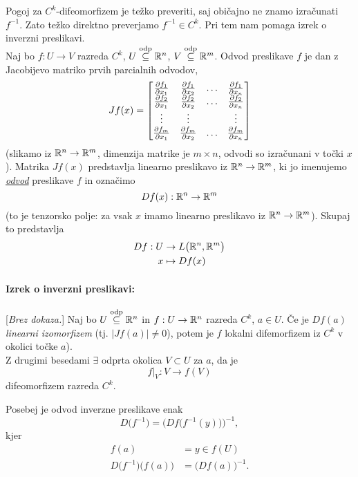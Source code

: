 Pogoj za $C^k$-difeomorfizem je te\v zko preveriti, saj obi\v cajno ne znamo izra\v cunati $f^{-1}$. Zato te\v zko direktno preverjamo $f^{-1} \in C^k$.
Pri tem nam pomaga izrek o inverzni preslikavi.\\[6pt]

Naj bo $f : U \to V$ razreda $C^k$, $U \odp \R^n$, $V \odp \R^m$. Odvod preslikave $f$ je dan z Jacobijevo matriko prvih parcialnih odvodov,
\[
	Jf(x) = \begin{bmatrix}
		\prt[1]{f_1} & \prt[2]{f_1} & \ldots & \prt[n]{f_1} \\
		\prt[1]{f_2} & \prt[2]{f_2} & \ldots & \prt[n]{f_2} \\
		\vdots       & \vdots       &        & \vdots       \\
		\prt[1]{f_m} & \prt[2]{f_m} & \ldots & \prt[n]{f_m}
	\end{bmatrix}
\] (slikamo iz $\R^n \to \R^m$, dimenzija matrike je $m \times n$, odvodi so izra\v cunani v to\v cki $x$). Matrika $Jf(x)$ predstavlja linearno
preslikavo iz $\R^n \to \R^m$, ki jo imenujemo \underline{\emph{odvod}} preslikave $f$ in ozna\v cimo
\[
	Df(x) : \R^n \to \R^m
\]
(to je tenzorsko polje: za vsak $x$ imamo linearno preslikavo iz $\R^n \to \R^m$). Skupaj to predstavlja
\begin{align*}
	Df : U &\to L\big(\R^n, \R^m\big) \\
	x &\mapsto Df(x)
\end{align*}

\begin{trditev}
\paragraph{Izrek o inverzni preslikavi:}[{\em Brez dokaza.}] Naj bo $U \odp \R^n$ in $f : U \to \R^n$ razreda $C^k$, $a \in U$. \v Ce je $Df(a)$
{\em linearni izomorfizem} (tj. $|Jf(a)| \neq 0$), potem je $f$ lokalni difemorfizem iz $C^k$ v okolici to\v cke $a$).\\[6pt]

\ni Z drugimi besedami $\exists$ odprta okolica $V \subset U$ za $a$, da je
\[
	f\big|_V : V \to f(V)
\]
difeomorfizem razreda $C^k$.

Posebej je odvod inverzne preslikave enak
\[
	D\big(f^{-1}\big) = \Big(Df\big(f^{-1}(y)\big)\Big)^{-1},
\]
kjer
\begin{align*}
	f(a) &= y \in f(U) \\
	D\big(f^{-1})\big(f(a)\big) &= \Big(Df(a)\Big)^{-1}.
\end{align*}
\end{trditev}

